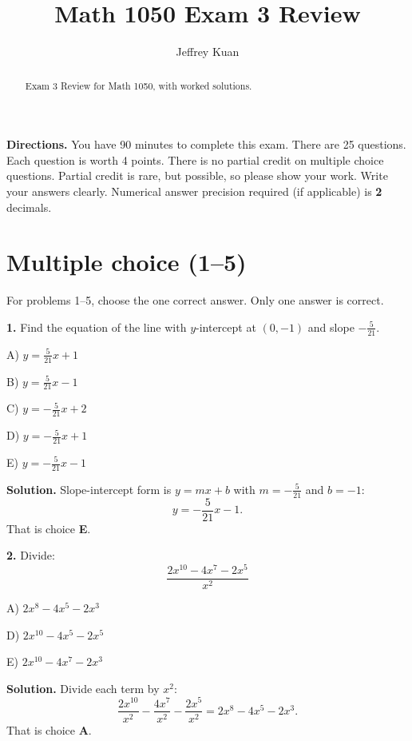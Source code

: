 \documentclass{ximera}
\author{Jeffrey Kuan}
\title{Math 1050 Exam 3 Review}
\begin{document}
\begin{abstract}
    Exam 3 Review for Math 1050, with worked solutions.
\end{abstract}

\maketitle

\textbf{Directions.} You have 90 minutes to complete this exam. There are 25 questions.
Each question is worth 4 points. There is no partial credit on multiple choice questions.
Partial credit is rare, but possible, so please show your work. Write your answers
clearly. Numerical answer precision required
(if applicable) is \textbf{2} decimals.

\section*{Multiple choice (1--5)}

For problems 1--5, choose the one correct answer. Only one
answer is correct.

\begin{problem}

\textbf{1.} Find the equation of the line with $y$-intercept at $(0,-1)$ and slope
$-\frac{5}{21}$.



A) $y=\frac{5}{21}x+1$

B) $y=\frac{5}{21}x-1$

C) $y=-\frac{5}{21}x+2$

D) $y=-\frac{5}{21}x+1$

E) $y=-\frac{5}{21}x-1$

\begin{hint}
\textbf{Solution.} Slope-intercept form is $y=mx+b$ with $m=-\frac{5}{21}$ and $b=-1$:
\[
  y=-\frac{5}{21}x-1 .
\]
That is choice \textbf{E}.
\end{hint}
\end{problem}

\begin{problem}

\textbf{2.} Divide:
\[
  \frac{2x^{10}-4x^{7}-2x^{5}}{x^{2}}
\]



A) $2x^{8}-4x^{5}-2x^{3}$

D) $2x^{10}-4x^{5}-2x^{5}$

E) $2x^{10}-4x^{7}-2x^{3}$

\begin{hint}
\textbf{Solution.} Divide each term by $x^{2}$:
\[
  \frac{2x^{10}}{x^{2}}-\frac{4x^{7}}{x^{2}}-\frac{2x^{5}}{x^{2}}
  = 2x^{8}-4x^{5}-2x^{3}.
\]
That is choice \textbf{A}.
\end{hint}
\end{problem}
\end{document}
